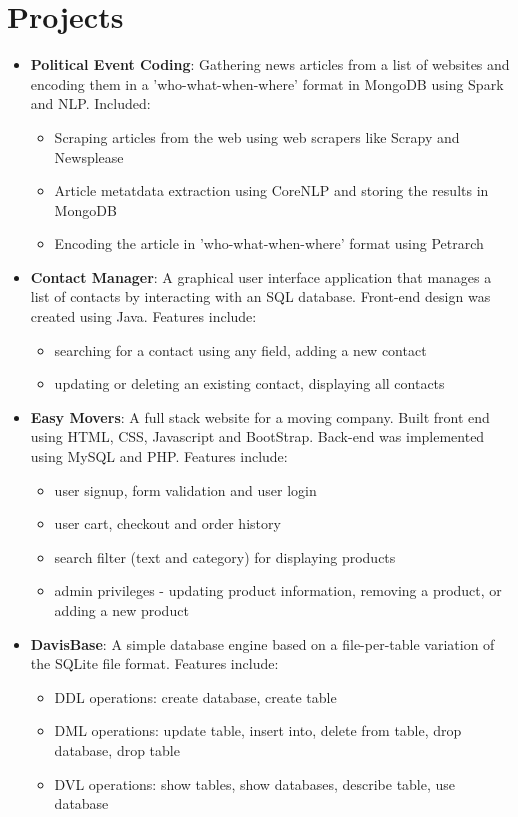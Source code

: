 \documentclass[letterpaper,11pt]{article}
\begin{document}
  \section{Projects}
 \begin{itemize}[noitemsep,nolistsep,leftmargin=*]
 \item \textbf{Political Event Coding}: Gathering news articles from a list of websites and encoding them in a 'who-what-when-where' format in MongoDB using Spark and NLP. Included:
\begin{itemize}[noitemsep,nolistsep,leftmargin=*]
\item Scraping articles from the web using web scrapers like Scrapy and Newsplease
\item Article metatdata extraction using CoreNLP and storing the results in MongoDB
\item Encoding the article in 'who-what-when-where' format using Petrarch
\end{itemize}

\item \textbf{Contact Manager}: A graphical user interface application that manages a list of contacts by interacting with an SQL database. Front-end design was created using Java. Features include:
\begin{itemize}[noitemsep,nolistsep,leftmargin=*]
\item searching for a contact using any field,  adding a new contact
\item  updating or deleting an existing contact, displaying all contacts
\end{itemize}

      
\item \textbf{Easy Movers}: A full stack website for a moving company. Built front end using HTML, CSS, Javascript and BootStrap. Back-end was implemented using MySQL and PHP. Features include:
 \begin{itemize}[noitemsep,nolistsep,leftmargin=*]
 \item  user signup, form validation and user login
 \item user cart, checkout and order history 
 \item search filter (text and category) for displaying products  
 \item admin privileges - updating product information, removing a product, or adding a new product
 \end{itemize}
      
\item \textbf{DavisBase}: A simple database engine based on a file-per-table variation of the SQLite file format. Features include:
 \begin{itemize}[noitemsep,nolistsep,leftmargin=*]
\item DDL operations: create database, create table 
 \item DML operations: update table, insert into, delete from table, drop database, drop table
 \item DVL operations: show tables, show databases, describe table, use database
      \end{itemize}


\end{itemize}
\end{document}
